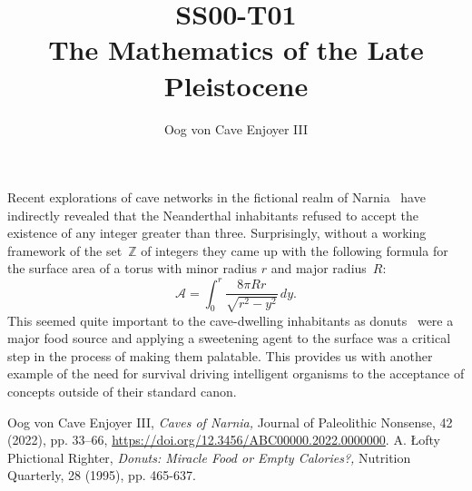\documentclass[11pt]{ximera}
\title{SS00-T01 \\ The Mathematics of the Late Pleistocene}
\author{Oog von Cave Enjoyer III}
\affil{Swedish Spelunking Academy}
\date{}
\begin{document}
\begin{abstract}
\end{abstract}
\maketitle
Recent explorations of cave networks in the fictional realm of
Narnia~\cite{OvCE} have indirectly revealed that the Neanderthal
inhabitants refused to accept the existence of any integer greater than
three.  Surprisingly, without a working framework of the 
set~\(\mathbb Z\) of integers they came up with the following formula
for the surface area of a torus with minor radius \(r\) and major 
radius~\(R\):
    \[\mathscr A = \int_{0}^{r}\frac{8 \pi Rr}{\sqrt{r^2-y^2}}\,dy.\]
This seemed quite important to the cave-dwelling inhabitants as
donuts~\cite{ALPW} were a major food source and applying a sweetening 
agent to the surface was a critical step in the process of making them 
palatable.  This provides us with another example of the need for
survival driving intelligent organisms to the acceptance of concepts
outside of their standard canon.
\begin{thebibliography}{2}
     Oog von Cave Enjoyer III, {\it Caves of Narnia,\/} 
    Journal of Paleolithic Nonsense, 42 (2022), pp. 33--66, 
    \url{https://doi.org/12.3456/ABC00000.2022.0000000}.
     A. \L ofty Phictional Righter, {\it Donuts: Miracle
    Food or Empty Calories?,\/} Nutrition Quarterly, 28 (1995), pp. 
    465-637.
\end{thebibliography}
\end{document}
